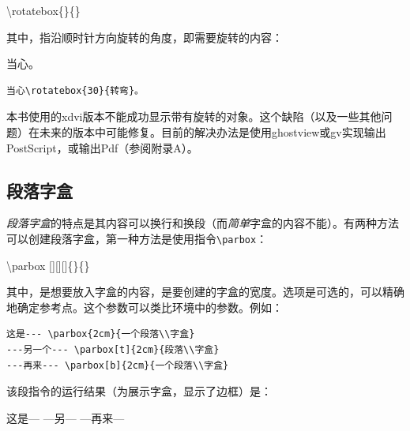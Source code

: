 \begin{dmd}
\backslash rotatebox\{\}\{\}
\end{dmd}

其中，指沿顺时针方向旋转的角度，即需要旋转的内容：

\begin{codelist}[4.15]{
  当心。
}
\begin{verbatim}
当心\rotatebox{30}{转弯}。\end{verbatim}
\end{codelist}

\begin{ii}
本书使用的xdvi版本不能成功显示带有旋转的对象。这个缺陷（以及一些其他问题）在未来的版本中可能修复。目前的解决办法是使用ghostview或gv实现输出PostScript，或输出Pdf（参阅附录A）。%
\end{ii}

\subsection{段落字盒}

\emph{段落字盒}的特点是其内容可以换行和换段（而\emph{简单}字盒的内容不能）。有两种方法可以创建段落字盒，第一种方法是使用指令\verb|\parbox|：

\begin{dmd}
\backslash parbox [][][]\{\}\{\}
\end{dmd}

其中，是想要放入字盒的内容，是要创建的字盒的宽度。选项是可选的，可以精确地确定参考点。这个参数可以类比环境中的参数。例如：

\begin{dmd}
  \begin{verbatim}
这是--- \parbox{2cm}{一个段落\\字盒}
---另一个--- \parbox[t]{2cm}{段落\\字盒}
---再来--- \parbox[b]{2cm}{一个段落\\字盒}
  \end{verbatim}
\end{dmd}

该段指令的运行结果（为展示字盒，显示了边框）是：

这是--- 
---另--- 
---再来--- 


